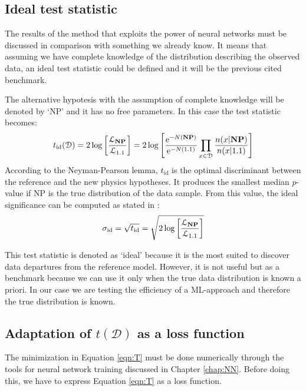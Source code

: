 \subsection{Ideal test statistic}
The results of the method that exploits the power of neural networks must be discussed in comparison with something we already know. It means that assuming we have complete knowledge of the distribution describing the observed data, an ideal test statistic could be defined and it will be the previous cited benchmark.

The alternative hypotesis with the assumption of complete knowledge will be denoted by `NP' and it has no free parameters. In this case the test statistic becomes:
\begin{equation}
	t_\mathrm{id}(\mathcal{D})
	=
	2 \log{\left[
	\frac{\mathcal{L}_{\text{\textbf{NP}}}}{\mathcal{L}_{1.1}}
	\right]}
	=	
	2 \log{ 
	\left[
	\frac{\operatorname{e}^{-N(\text{\textbf{NP}})}}{\operatorname{e}^{-N(1.1)}}
	\prod_{x \in \mathcal{D}} \frac{n(x|\text{\textbf{NP}})}{n(x|1.1)}
	\right]
	}
\end{equation}
According to the Neyman-Pearson lemma, $t_\mathrm{id}$ is the optimal discriminant between the reference and the new physics hypotheses. It produces the smallest median $p$-value if NP is the true distribution of the data sample. From this value, the ideal significance can be computed as stated in \cite{cowan}:
\begin{equation}
	\sigma_\mathrm{id}
	=
	\sqrt{t_\mathrm{id}}
	=	
	\sqrt{
	2 \log{\left[
	\frac{\mathcal{L}_{\text{\textbf{NP}}}}{\mathcal{L}_{1.1}}
	\right]}
	}	\label{eqn:ID_SIG}
\end{equation}

This test statistic is denoted as `ideal' because it is the most suited to discover data departures from the reference model. However, it is not useful but as a benchmark because we can use it only when the true data distribution is known a priori. In our case we are testing the efficiency of a ML-approach and therefore the true distribution is known.



\subsection{Adaptation of $t(\mathcal{D})$ as a loss function}
The minimization in Equation \ref{eqn:T} must be done numerically through the tools for neural network training discussed in Chapter \ref{chap:NN}. Before doing this, we have to express Equation \ref{eqn:T} as a loss function.

